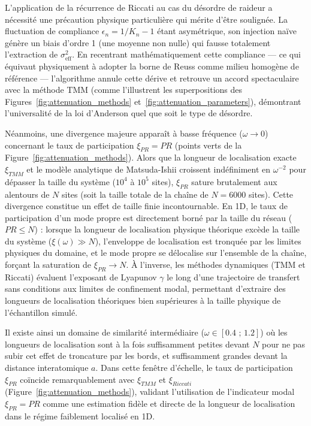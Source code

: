 L'application de la récurrence de Riccati au cas du désordre de raideur a nécessité une précaution physique particulière qui mérite d'être soulignée. La fluctuation de compliance $\epsilon_n = 1/K_n - 1$ étant asymétrique, son injection naïve génère un biais d'ordre 1 (une moyenne non nulle) qui fausse totalement l'extraction de $\sigma_{\mathrm{eff}}^2$. En recentrant mathématiquement cette compliance --- ce qui équivaut physiquement à adopter la borne de Reuss comme milieu homogène de référence --- l'algorithme annule cette dérive et retrouve un accord spectaculaire avec la méthode TMM (comme l'illustrent les superpositions des Figures~\ref{fig:attenuation_methods} et~\ref{fig:attenuation_parameters}), démontrant l'universalité de la loi d'Anderson quel que soit le type de désordre.

Néanmoins, une divergence majeure apparaît à basse fréquence ($\omega \to 0$) concernant le taux de participation $\xi_{PR} = PR$ (points verts de la Figure~\ref{fig:attenuation_methods}). Alors que la longueur de localisation exacte $\xi_{TMM}$ et le modèle analytique de Matsuda-Ishii croissent indéfiniment en $\omega^{-2}$ pour dépasser la taille du système ($10^4$ à $10^5$ sites), $\xi_{PR}$ sature brutalement aux alentours de $N$ sites (soit la taille totale de la chaîne de $N=6000$ sites). Cette divergence constitue un effet de taille finie incontournable. En 1D, le taux de participation d'un mode propre est directement borné par la taille du réseau ($PR \le N$) : lorsque la longueur de localisation physique théorique excède la taille du système ($\xi(\omega) \gg N$), l'enveloppe de localisation est tronquée par les limites physiques du domaine, et le mode propre se délocalise sur l'ensemble de la chaîne, forçant la saturation de $\xi_{PR} \to N$. À l'inverse, les méthodes dynamiques (TMM et Riccati) évaluent l'exposant de Lyapunov $\gamma$ le long d'une trajectoire de transfert sans conditions aux limites de confinement modal, permettant d'extraire des longueurs de localisation théoriques bien supérieures à la taille physique de l'échantillon simulé.

Il existe ainsi un domaine de similarité intermédiaire ($\omega \in [0.4 \text{ ; } 1.2]$) où les longueurs de localisation sont à la fois suffisamment petites devant $N$ pour ne pas subir cet effet de troncature par les bords, et suffisamment grandes devant la distance interatomique $a$. Dans cette fenêtre d'échelle, le taux de participation $\xi_{PR}$ coïncide remarquablement avec $\xi_{TMM}$ et $\xi_{Riccati}$ (Figure~\ref{fig:attenuation_methods}), validant l'utilisation de l'indicateur modal $\xi_{PR} = PR$ comme une estimation fidèle et directe de la longueur de localisation dans le régime faiblement localisé en 1D.


